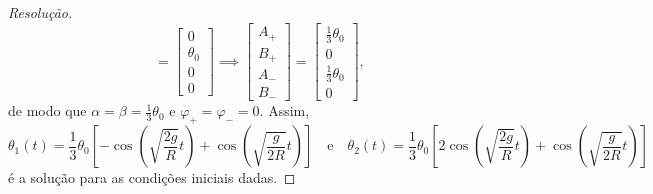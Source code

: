 \begin{proof}[Resolução]
\begin{equation*}
        =
        \begin{bmatrix}
            0\\\theta_0\\0\\0
        \end{bmatrix}
        \implies
        \begin{bmatrix}
            A_+\\ B_+\\A_-\\B_-
        \end{bmatrix}
        =
        \begin{bmatrix}
            \frac13 \theta_0\\0\\\frac13\theta_0\\0
        \end{bmatrix},
    \end{equation*}
    de modo que \(\alpha = \beta = \frac13\theta_0\) e \(\varphi_+ = \varphi_- = 0\). Assim,
    \begin{equation*}
        \theta_1(t) = \frac13\theta_0\left[-\cos\left(\sqrt{\frac{2g}{R}}t\right) + \cos\left(\sqrt{\frac{g}{2R}}t\right)\right]\quad\text{e}\quad
        \theta_2(t) = \frac13\theta_0\left[2\cos\left(\sqrt{\frac{2g}{R}}t\right) + \cos\left(\sqrt{\frac{g}{2R}}t\right)\right]
    \end{equation*}
    é a solução para as condições iniciais dadas.
\end{proof}
